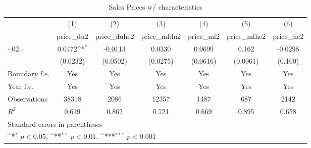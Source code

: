 \begin{table}[htbp]\centering
\def\sym#1{\ifmmode^{#1}\else\(^{#1}\)\fi}
\caption{Sales Prices w/ characteristics}
\begin{tabular}{l*{6}{c}}
\hline\hline
                    &\multicolumn{1}{c}{(1)}&\multicolumn{1}{c}{(2)}&\multicolumn{1}{c}{(3)}&\multicolumn{1}{c}{(4)}&\multicolumn{1}{c}{(5)}&\multicolumn{1}{c}{(6)}\\
                    &\multicolumn{1}{c}{price\_du2}&\multicolumn{1}{c}{price\_duhe2}&\multicolumn{1}{c}{price\_mfdu2}&\multicolumn{1}{c}{price\_mf2}&\multicolumn{1}{c}{price\_mfhe2}&\multicolumn{1}{c}{price\_he2}\\
\hline
-.02                &      0.0472\sym{*}  &     -0.0113         &      0.0330         &      0.0699         &       0.162         &     -0.0298         \\
                    &    (0.0232)         &    (0.0502)         &    (0.0275)         &    (0.0616)         &    (0.0961)         &     (0.100)         \\
[1em]
Boundary f.e.       &         Yes         &         Yes         &         Yes         &         Yes         &         Yes         &         Yes         \\
[1em]
Year f.e.           &         Yes         &         Yes         &         Yes         &         Yes         &         Yes         &         Yes         \\
\hline
Observations        &       38318         &        2086         &       12357         &        1487         &         687         &        2142         \\
\(R^{2}\)           &       0.619         &       0.862         &       0.721         &       0.669         &       0.895         &       0.658         \\
\hline\hline
\multicolumn{7}{l}{\footnotesize Standard errors in parentheses}\\
\multicolumn{7}{l}{\footnotesize \sym{*} \(p<0.05\), \sym{**} \(p<0.01\), \sym{***} \(p<0.001\)}\\
\end{tabular}
\end{table}
